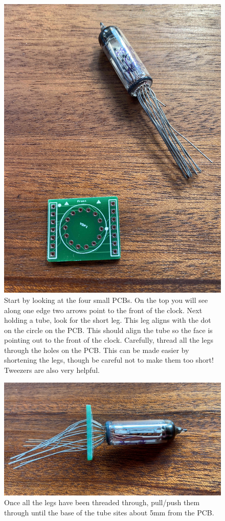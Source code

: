 \documentclass[12pt]{article}
\begin{document}
 
\begin{figure}[t]
\includegraphics[scale=0.05, angle=270]{IMG_1094}
\centering
\caption{Start by looking at the four small PCBs. On the top you will see along one edge two arrows point to the front of the clock. Next holding a tube, look for the short leg. This leg aligns with the dot on the circle on the PCB. This should align the tube so the face is pointing out to the front of the clock. Carefully, thread all the legs through the holes on the PCB. This can be made easier by shortening the legs, though be careful not to make them too short! Tweezers are also very helpful.}
\label{fig:tubepcb}
\end{figure}

\begin{figure}[t]
\includegraphics[scale=0.4]{IMG_11051}
\centering
\caption{Once all the legs have been threaded through, pull/push them through until the base of the tube sites about 5mm from the PCB.}
\label{fig:tubeinpcb}
\end{figure}
\end{document}
